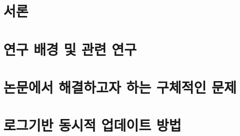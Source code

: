 \documentclass[doctor,korean,final]{kmu}
\begin{document}




\newif\ifkor
\kortrue 



\tableofcontents
\listoffigures

\setcounter{page}{\value{pagemarker}}         %
\label{paperlastromanpagelabel}     %

\hfill \break

\newpage \setcounter{pagemarker}{\value{page}}%

\chapter{서론}

\chapter{연구 배경 및 관련 연구}\label{sec:related}

\chapter{논문에서 해결하고자 하는 구체적인 문제}\label{sec:problem}

\chapter{로그기반 동시적 업데이트 방법}



\end{document}
